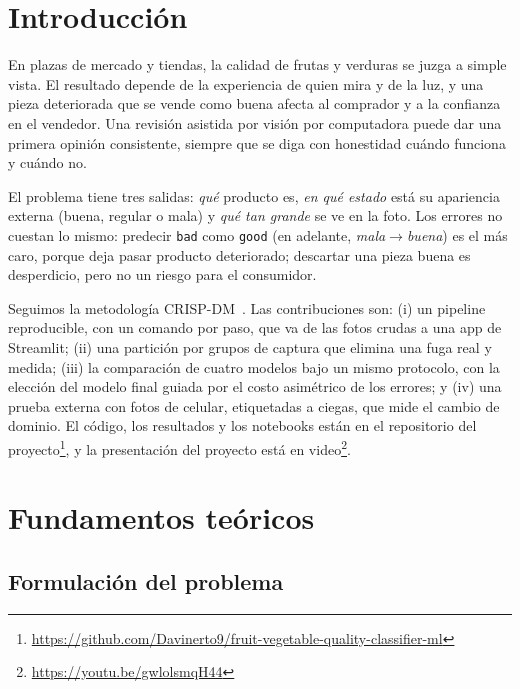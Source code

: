 \documentclass[conference]{IEEEtran}
\newcommand{\cls}[1]{\texttt{#1}}
\newcommand{\mb}{mala$\to$buena}
\begin{document}
\section{Introducción}

En plazas de mercado y tiendas, la calidad de frutas y verduras se juzga a simple vista. El resultado depende de la experiencia de quien mira y de la luz, y una pieza deteriorada que se vende como buena afecta al comprador y a la confianza en el vendedor. Una revisión asistida por visión por computadora puede dar una primera opinión consistente, siempre que se diga con honestidad cuándo funciona y cuándo no.

El problema tiene tres salidas: \emph{qué} producto es, \emph{en qué estado} está su apariencia externa (buena, regular o mala) y \emph{qué tan grande} se ve en la foto. Los errores no cuestan lo mismo: predecir \cls{bad} como \cls{good} (en adelante, \emph{\mb}) es el más caro, porque deja pasar producto deteriorado; descartar una pieza buena es desperdicio, pero no un riesgo para el consumidor.

Seguimos la metodología CRISP-DM~\cite{chapman2000}. Las contribuciones son: (i) un pipeline reproducible, con un comando por paso, que va de las fotos crudas a una app de Streamlit; (ii) una partición por grupos de captura que elimina una fuga real y medida; (iii) la comparación de cuatro modelos bajo un mismo protocolo, con la elección del modelo final guiada por el costo asimétrico de los errores; y (iv) una prueba externa con fotos de celular, etiquetadas a ciegas, que mide el cambio de dominio. El código, los resultados y los notebooks están en el repositorio del proyecto\footnote{\url{https://github.com/Davinerto9/fruit-vegetable-quality-classifier-ml}}, y la presentación del proyecto está en video\footnote{\url{https://youtu.be/gwlolsmqH44}}.

\section{Fundamentos teóricos}

\subsection{Formulación del problema}
\end{document}
